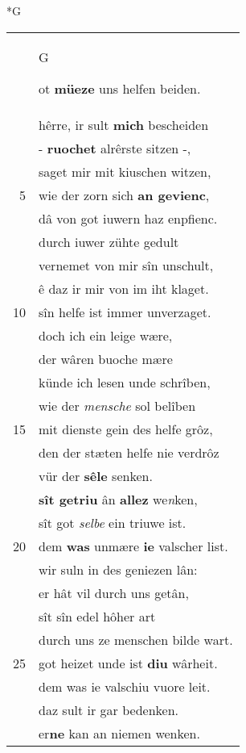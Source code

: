 \documentclass[8pt,a4paper,notitlepage]{article}
\begin{document}
\begin{table}[ht]
\begin{minipage}[t]{0.5\linewidth}
\small
\begin{center}*G
\end{center}
\begin{tabular}{rl}
 & \begin{large}G\end{large}ot \textbf{müeze} uns helfen beiden.\\ 
 & hêrre, ir sult \textbf{mich} bescheiden\\ 
 & - \textbf{ruochet} alrêrste sitzen -,\\ 
 & saget mir mit kiuschen witzen,\\ 
5 & wie der zorn sich \textbf{an gevienc},\\ 
 & dâ von got iuwern haz enpfienc.\\ 
 & durch iuwer zühte gedult\\ 
 & vernemet von mir sîn unschult,\\ 
 & ê daz ir mir von im iht klaget.\\ 
10 & sîn helfe ist immer unverzaget.\\ 
 & doch ich ein leige wære,\\ 
 & der wâren buoche mære\\ 
 & künde ich lesen unde schrîben,\\ 
 & wie der \textit{mensche} sol belîben\\ 
15 & mit dienste gein des helfe grôz,\\ 
 & den der stæten helfe nie verdrôz\\ 
 & vür der \textbf{sêle} senken.\\ 
 & \textbf{sît getriu} ân \textbf{allez} we\textit{n}ken,\\ 
 & sît got \textit{selbe} ein triuwe ist.\\ 
20 & dem \textbf{was} unmære \textbf{ie} valscher list.\\ 
 & wir suln in des geniezen lân:\\ 
 & er hât vil durch uns getân,\\ 
 & sît sîn edel hôher art\\ 
 & durch uns ze menschen bilde wart.\\ 
25 & got heizet unde ist \textbf{diu} wârheit.\\ 
 & dem was ie valschiu vuore leit.\\ 
 & daz sult ir gar bedenken.\\ 
 & er\textbf{ne} kan an niemen wenken.\\ 

\end{tabular}
\end{minipage}
\end{table}
\end{document}
